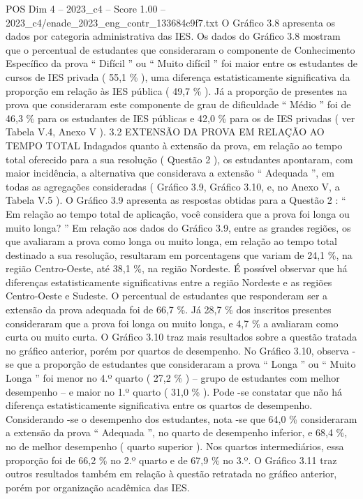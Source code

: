 \begin{textsample}{POS Dim 4 – 2023\_c4 – Score 1.00 – 2023\_c4/enade\_2023\_eng\_contr\_133684c9f7.txt}
O Gráfico 3.8 apresenta os dados por categoria administrativa das IES.
Os dados do Gráfico 3.8 mostram que o percentual de estudantes que consideraram o componente de Conhecimento Específico da prova “ Difícil ” ou “ Muito difícil ” foi maior entre os estudantes de cursos de IES privada ( 55,1 \% ), uma diferença estatisticamente significativa da proporção em relação às IES pública ( 49,7 \% ).
Já a proporção de presentes na prova que consideraram este componente de grau de dificuldade “ Médio ” foi de 46,3 \% para os estudantes de IES públicas e 42,0 \% para os de IES privadas ( ver Tabela V.4, Anexo V ). 3.2 EXTENSÃO DA PROVA EM RELAÇÃO AO TEMPO TOTAL Indagados quanto à extensão da prova, em relação ao tempo total oferecido para a sua resolução ( Questão 2 ), os estudantes apontaram, com maior incidência, a alternativa que considerava a extensão “ Adequada ”, em todas as agregações consideradas ( Gráfico 3.9, Gráfico 3.10, e, no Anexo V, a Tabela V.5 ).
O Gráfico 3.9 apresenta as respostas obtidas para a Questão 2 : “ Em relação ao tempo total de aplicação, você considera que a prova foi longa ou muito longa? ” Em relação aos dados do Gráfico 3.9, entre as grandes regiões, os que avaliaram a prova como longa ou muito longa, em relação ao tempo total destinado a sua resolução, resultaram em porcentagens que variam de 24,1 \%, na região Centro-Oeste, até 38,1 \%, na região Nordeste.
É possível observar que há diferenças estatisticamente significativas entre a região Nordeste e as regiões Centro-Oeste e Sudeste.
O percentual de estudantes que responderam ser a extensão da prova adequada foi de 66,7 \%.
Já 28,7 \% dos inscritos presentes consideraram que a prova foi longa ou muito longa, e 4,7 \% a avaliaram como curta ou muito curta.
O Gráfico 3.10 traz mais resultados sobre a questão tratada no gráfico anterior, porém por quartos de desempenho.
No Gráfico 3.10, observa -se que a proporção de estudantes que consideraram a prova “ Longa ” ou “ Muito Longa ” foi menor no 4.º quarto ( 27,2 \% ) – grupo de estudantes com melhor desempenho – e maior no 1.º quarto ( 31,0 \% ).
Pode -se constatar que não há diferença estatisticamente significativa entre os quartos de desempenho.
Considerando -se o desempenho dos estudantes, nota -se que 64,0 \% consideraram a extensão da prova “ Adequada ”, no quarto de desempenho inferior, e 68,4 \%, no de melhor desempenho ( quarto superior ).
Nos quartos intermediários, essa proporção foi de 66,2 \% no 2.º quarto e de 67,9 \% no 3.º.
O Gráfico 3.11 traz outros resultados também em relação à questão retratada no gráfico anterior, porém por organização acadêmica das IES.

\end{textsample}
